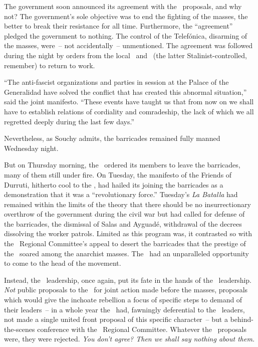 The government soon announced its agreement with the \CNT\ proposals, and why not? The government’s sole objective was to end the fighting of the masses, the better to break their resistance for all time. Furthermore, the ``agreement'' pledged the government to nothing. The control of the Telef\'onica, disarming of the masses, were~-- not accidentally~-- unmentioned. The agreement was followed during the night by orders from the local \CNT\ and \UGT\ (the latter Stalinist-controlled, remember) to return to work.

``The anti-fascist organizations and parties in session at the Palace of the Generalidad have solved the conflict that has created this abnormal situation,'' said the joint manifesto.
``These events have taught us that from now on we shall have to establish relations of cordiality and comradeship, the lack of which we all regretted deeply during the last few days.''

Nevertheless, as Souchy admits, the barricades remained fully manned Wednesday night.

But on Thursday morning, the \POUM\ ordered its members to leave the barricades, many of them still under fire. On Tuesday, the manifesto of the Friends of Durruti, hitherto cool to the \POUM\kn, had hailed its joining the barricades as a demonstration that it was a ``revolutionary force.'' Tuesday’s \emph{La Batalla} had remained within the limits of the theory that there should be no insurrectionary overthrow of the government during the civil war but had called for defense of the barricades, the dismissal of Salas and Ayguad\'e, withdrawal of the decrees dissolving the worker patrols. Limited as this program was, it contrasted so with the \CNT\ Regional Committee’s appeal to desert the barricades that the prestige of the \POUM\ soared among the anarchist masses. The \POUM\ had an unparalleled opportunity to come to the head of the movement.

Instead, the \POUM\ leadership, once again, put its fate in the hands of the \CNT\ leadership. \emph{Not} public proposals to the \CNT\ for joint action made before the masses, proposals which would give the inchoate rebellion a focus of specific steps to demand of their leaders~-- in a whole year the \POUM\ had, fawningly deferential to the \CNT\ leaders, not made a single united front proposal of this specific character~-- but a behind-the-scenes conference with the \CNT\ Regional Committee. Whatever the \POUM\ proposals were, they were rejected. \emph{You don’t agree? Then we shall say nothing about them.}

